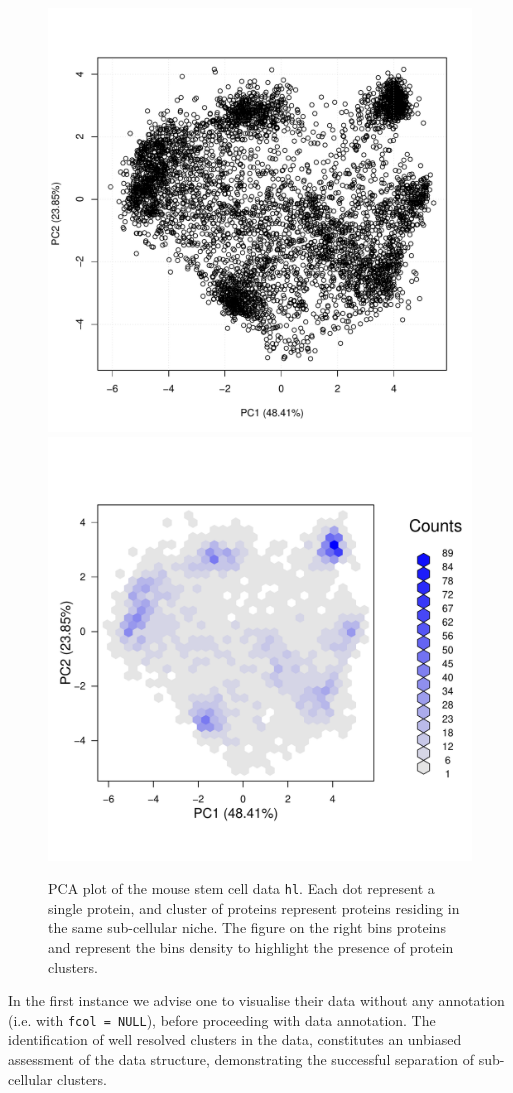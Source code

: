 \begin{figure}[!ht]
  \centering
\begin{knitrout}
\color{fgcolor}\begin{kframe}
\begin{alltt}
\hlstd{(}\hlstd{)}
  \hlstd{=} \hlstd{,}  \hlstd{=} \hlstd{)}
  \hlstd{=} \hlstd{)}
\end{alltt}
\end{kframe}
\includegraphics[width=.45\textwidth]{figure/qcplot-1} 
\includegraphics[width=.45\textwidth]{figure/qcplot-2} 

\end{knitrout}
\caption{PCA plot of the mouse stem cell data \texttt{hl}. Each dot
  represent a single protein, and cluster of proteins represent
  proteins residing in the same sub-cellular niche. The figure on the
  right bins proteins and represent the bins density to highlight the
  presence of protein clusters. }
  \label{fig:pcahl}
\end{figure}

In the first instance we advise one to visualise their data without
any annotation (i.e. with \texttt{fcol = NULL}), before proceeding with data
annotation. The identification of well resolved clusters in the data,
constitutes an unbiased assessment of the data structure,
demonstrating the successful separation of sub-cellular clusters.

